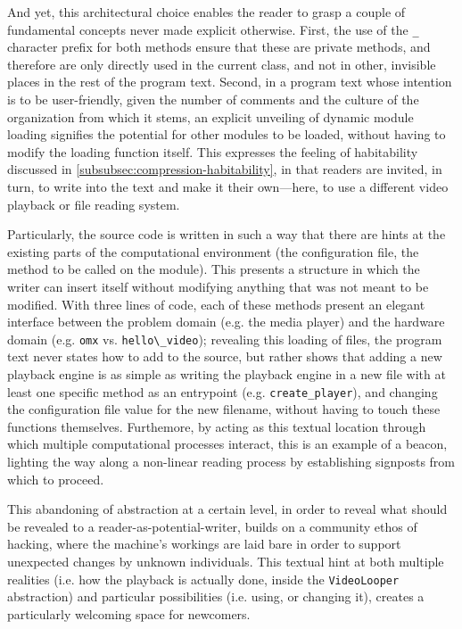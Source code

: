 And yet, this architectural choice enables the reader to grasp a couple of fundamental concepts never made explicit otherwise. First, the use of the \lstinline{_} character prefix for both methods ensure that these are private methods, and therefore are only directly used in the current class, and not in other, invisible places in the rest of the program text. Second, in a program text whose intention is to be user-friendly, given the number of comments and the culture of the organization from which it stems, an explicit unveiling of dynamic module loading signifies the potential for other modules to be loaded, without having to modify the loading function itself. This expresses the feeling of habitability discussed in \ref{subsubsec:compression-habitability}, in that readers are invited, in turn, to write into the text and make it their own—here, to use a different video playback or file reading system.

Particularly, the source code is written in such a way that there are hints at the existing parts of the computational environment (the configuration file, the method to be called on the module). This presents a structure in which the writer can insert itself without modifying anything that was not meant to be modified. With three lines of code, each of these methods present an elegant interface between the problem domain (e.g. the media player) and the hardware domain (e.g. \lstinline{omx} vs. \lstinline{hello\_video}); revealing this loading of files, the program text never states how to add to the source, but rather shows that adding a new playback engine is as simple as writing the playback engine in a new file with at least one specific method as an entrypoint (e.g. \lstinline{create_player}), and changing the configuration file value for the new filename, without having to touch these functions themselves. Furthemore, by acting as this textual location through which multiple computational processes interact, this is an example of a beacon, lighting the way along a non-linear reading process by establishing signposts from which to proceed.

This abandoning of abstraction at a certain level, in order to reveal what should be revealed to a reader-as-potential-writer, builds on a community ethos of hacking, where the machine's workings are laid bare in order to support unexpected changes by unknown individuals. This textual hint at both multiple realities (i.e. how the playback is actually done, inside the \lstinline{VideoLooper} abstraction) and particular possibilities (i.e. using, or changing it), creates a particularly welcoming space for newcomers.


